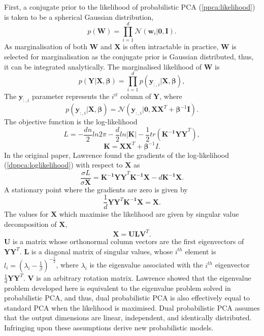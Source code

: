 \documentclass[ %
author={Dillon Keith Diep},
supervisor={Dr. Carl Henrik Ek},
degree={MEng},
title={ART-CG Hair:},
subtitle={Assisted Real-time Content Generation of Stylised Virtual Hair},
type={Research},
year={2017} ]{dissertation}
\begin{document}
First, a conjugate prior to the likelihood of probabilistic PCA (\ref{ppca:likelihood}) is taken to be a spherical Gaussian distribution,
$$p(\bm{W})=\prod^d_{i=1}\mathcal{N}(\bm{w}_i|\bm{0,I}).$$
As marginalisation of both $\bm{W}$ and $\bm{X}$ is often intractable in practice, $\bm{W}$ is selected for marginalisation as the conjugate prior is Gaussian distributed, thus, it can be integrated analytically.
The marginalised likelihood of $\bm{W}$ is
$$p(\bm{Y|X},\bm{\beta})=\prod^d_{i=1}p(\bm{y}_{:,i}|\bm{X},\bm{\beta}),$$
The $\bm{y}_{:,i}$ parameter represents the $i^{it}$ column of $\bm{Y}$, where
\begin{equation} \label{gplvm:marginal}
p(\bm{y}_{:,i}|\bm{X},\bm{\beta})=\mathcal{N}(\bm{y}_{:,i}|\bm{0,XX}^T+\bm{\beta}^{-1}\bm{I}).
\end{equation}
The objective function is the log-likelihood
\begin{equation} \label{dppca:loglikelihood}
L=-\frac{dn}{2}ln2\pi-\frac{d}{2}ln|\bm{K}|-\frac{1}{2}tr(\bm{K^{-1}YY}^T),
\end{equation}
$$\bm{K=XX}^T+\bm{\beta}^{-1}I.$$
In the original paper, Lawrence found the gradients of the log-likelihood (\ref{dppca:loglikelihood}) with respect to $\bm{X}$ as
$$\frac{\sigma L}{\sigma \bm{X}}=\bm{K^{-1}YY}^T\bm{K^{-1}X}-d\bm{K^{-1}X}.$$ 
A stationary point where the gradients are zero is given by
$$\frac{1}{d}\bm{YY}^T\bm{K^{-1}X=X}.$$
The values for $\bm{X}$ which maximise the likelihood are given by singular value decomposition of $\bm{X}$,
$$\bm{X=ULV}^T.$$
$\bm{U}$ is a matrix whose orthonormal column vectors are the first eigenvectors of $\bm{YY}^T$. $\bm{L}$ is a diagonal matrix of singular values, whose $i^{th}$ element is $l_i=(\lambda_i-\frac{1}{\beta})^{-\frac{1}{2}}$, where $\lambda_i$ is the eigenvalue associated with the $i^{th}$ eigenvector $\frac{1}{d}\bm{YY}^T$. $\bm{V}$ is an arbitrary rotation matrix. Lawrence showed that the eigenvalue problem developed here is equivalent to the eigenvalue problem solved in probabilistic PCA, and thus, dual probabilistic PCA is also effectively equal to standard PCA when the likelihood is maximised.
Dual probabilistic PCA assumes that the output dimensions are linear, independent, and identically distributed. Infringing upon these assumptions derive new probabilistic models.
\end{document}
